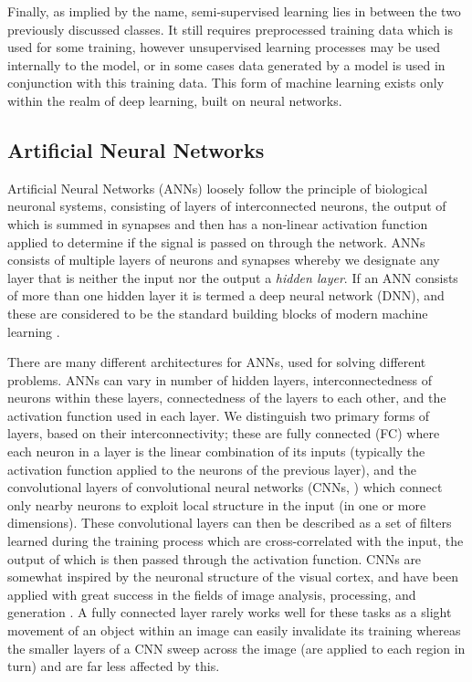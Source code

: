 Finally, as implied by the name, semi-supervised learning lies in between the two previously discussed classes.
It still requires preprocessed training data which is used for some training, however unsupervised learning processes may be used internally to the model, or in some cases data generated by a model is used in conjunction with this training data.
This form of machine learning exists only within the realm of deep learning, built on neural networks.

\subsection{Artificial Neural Networks}

Artificial Neural Networks (ANNs) loosely follow the principle of biological neuronal systems, consisting of layers of interconnected neurons, the output of which is summed in synapses and then has a non-linear activation function applied to determine if the signal is passed on through the network.
ANNs consists of multiple layers of neurons and synapses whereby we designate any layer that is neither the input nor the output a \emph{hidden layer}.
If an ANN consists of more than one hidden layer it is termed a deep neural network (DNN), and these are considered to be the standard building blocks of modern machine learning \citep{Raschka2015}.

There are many different architectures for ANNs, used for solving different problems.
ANNs can vary in number of hidden layers, interconnectedness of neurons within these layers, connectedness of the layers to each other, and the activation function used in each layer.
We distinguish two primary forms of layers, based on their interconnectivity; these are fully connected (FC) where each neuron in a layer is the linear combination of its inputs (typically the activation function applied to the neurons of the previous layer), and the convolutional layers of convolutional neural networks (CNNs, \citet{1998Lecun,2003Simard}) which connect only nearby neurons to exploit local structure in the input (in one or more dimensions).
These convolutional layers can then be described as a set of filters learned during the training process which are cross-correlated with the input, the output of which is then passed through the activation function.
CNNs are somewhat inspired by the neuronal structure of the visual cortex, and have been applied with great success in the fields of image analysis, processing, and generation \citep{Raschka2015}.
A fully connected layer rarely works well for these tasks as a slight movement of an object within an image can easily invalidate its training whereas the smaller layers of a CNN sweep across the image (are applied to each region in turn) and are far less affected by this.

